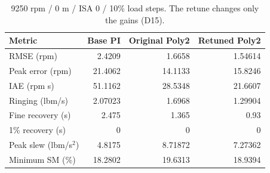\begin{table}[htbp]\centering\small\setlength{\tabcolsep}{4pt}\begin{tabular}{@{}lrrr@{}}\toprule
Metric & Base PI & Original Poly2 & Retuned Poly2\\\midrule
RMSE (rpm) & 2.4209 & 1.6658 & 1.54614\\
Peak error (rpm) & 21.4062 & 14.1133 & 15.8246\\
IAE (rpm s) & 51.1162 & 28.5348 & 21.6607\\
Ringing (lbm/s) & 2.07023 & 1.6968 & 1.29904\\
Fine recovery (s) & 2.475 & 1.365 & 0.93\\
1\% recovery (s) & 0 & 0 & 0\\
Peak slew (lbm/s$^2$) & 4.8175 & 8.71872 & 7.27362\\
Minimum SM (\%) & 18.2802 & 19.6313 & 18.9394\\
\bottomrule\end{tabular}\caption{9250 rpm / 0 m / ISA 0 / 10\% load steps. The retune changes only the gains (D15).}\label{tab:tune}\end{table}